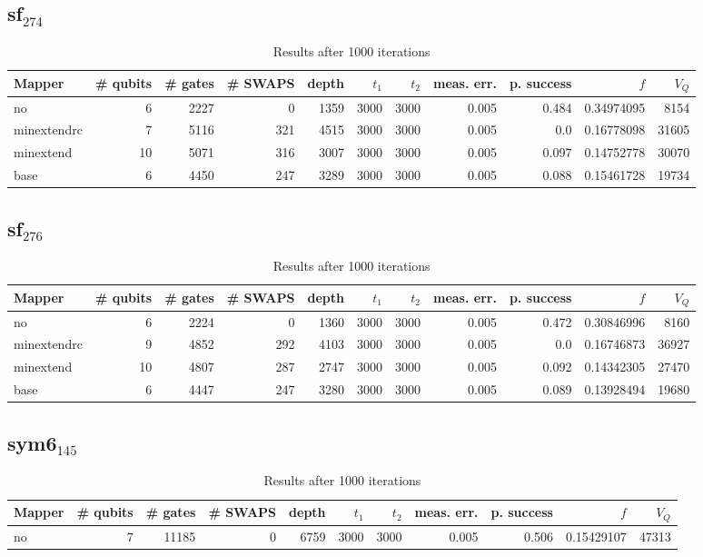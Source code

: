 \documentclass[11pt]{article}
\begin{document}
\subsection{sf\(_{\text{274}}\)}
\label{sec:org6d48619}
\begin{table}[!htpb]
\caption{\label{tab:orgb9d9e82}
Results after 1000 iterations}
\centering
\begin{tabular}{lrrrrrrrrrr}
\hline
Mapper & \# qubits & \# gates & \# SWAPS & depth & \(t_1\) & \(t_2\) & meas. err. & p. success & \(f\) & \(V_Q\)\\
\hline
no & 6 & 2227 & 0 & 1359 & 3000 & 3000 & 0.005 & 0.484 & 0.34974095 & 8154\\
\hline
minextendrc & 7 & 5116 & 321 & 4515 & 3000 & 3000 & 0.005 & 0.0 & 0.16778098 & 31605\\
minextend & 10 & 5071 & 316 & 3007 & 3000 & 3000 & 0.005 & 0.097 & 0.14752778 & 30070\\
base & 6 & 4450 & 247 & 3289 & 3000 & 3000 & 0.005 & 0.088 & 0.15461728 & 19734\\
\hline
\end{tabular}
\end{table}
\subsection{sf\(_{\text{276}}\)}
\label{sec:org05aead9}
\begin{table}[!htpb]
\caption{\label{tab:org91e39da}
Results after 1000 iterations}
\centering
\begin{tabular}{lrrrrrrrrrr}
\hline
Mapper & \# qubits & \# gates & \# SWAPS & depth & \(t_1\) & \(t_2\) & meas. err. & p. success & \(f\) & \(V_Q\)\\
\hline
no & 6 & 2224 & 0 & 1360 & 3000 & 3000 & 0.005 & 0.472 & 0.30846996 & 8160\\
\hline
minextendrc & 9 & 4852 & 292 & 4103 & 3000 & 3000 & 0.005 & 0.0 & 0.16746873 & 36927\\
minextend & 10 & 4807 & 287 & 2747 & 3000 & 3000 & 0.005 & 0.092 & 0.14342305 & 27470\\
base & 6 & 4447 & 247 & 3280 & 3000 & 3000 & 0.005 & 0.089 & 0.13928494 & 19680\\
\hline
\end{tabular}
\end{table}
\subsection{sym6\(_{\text{145}}\)}
\label{sec:org217d004}
\begin{table}[!htpb]
\caption{\label{tab:org1dfe691}
Results after 1000 iterations}
\centering
\begin{tabular}{lrrrrrrrrrr}
\hline
Mapper & \# qubits & \# gates & \# SWAPS & depth & \(t_1\) & \(t_2\) & meas. err. & p. success & \(f\) & \(V_Q\)\\
\hline
no & 7 & 11185 & 0 & 6759 & 3000 & 3000 & 0.005 & 0.506 & 0.15429107 & 47313\\
\hline
\end{tabular}
\end{table}
\end{document}
